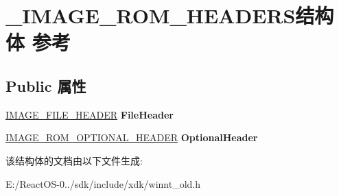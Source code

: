 \hypertarget{struct___i_m_a_g_e___r_o_m___h_e_a_d_e_r_s}{}\section{\+\_\+\+I\+M\+A\+G\+E\+\_\+\+R\+O\+M\+\_\+\+H\+E\+A\+D\+E\+R\+S结构体 参考}
\label{struct___i_m_a_g_e___r_o_m___h_e_a_d_e_r_s}
\subsection*{Public 属性}
\begin{DoxyCompactItemize}
\item 
\mbox{\label{struct___i_m_a_g_e___r_o_m___h_e_a_d_e_r_s_a55200576b11023b48894997c119c872a}} 
\hyperlink{struct___i_m_a_g_e___f_i_l_e___h_e_a_d_e_r}{I\+M\+A\+G\+E\+\_\+\+F\+I\+L\+E\+\_\+\+H\+E\+A\+D\+ER} {\bfseries File\+Header}
\item 
\mbox{\label{struct___i_m_a_g_e___r_o_m___h_e_a_d_e_r_s_acb1c195205fac3b3e88356da136be1f1}} 
\hyperlink{struct___i_m_a_g_e___r_o_m___o_p_t_i_o_n_a_l___h_e_a_d_e_r}{I\+M\+A\+G\+E\+\_\+\+R\+O\+M\+\_\+\+O\+P\+T\+I\+O\+N\+A\+L\+\_\+\+H\+E\+A\+D\+ER} {\bfseries Optional\+Header}
\end{DoxyCompactItemize}


该结构体的文档由以下文件生成\+:\begin{DoxyCompactItemize}
\item 
E\+:/\+React\+O\+S-\/0../sdk/include/xdk/winnt\+\_\+old.\+h\end{DoxyCompactItemize}
